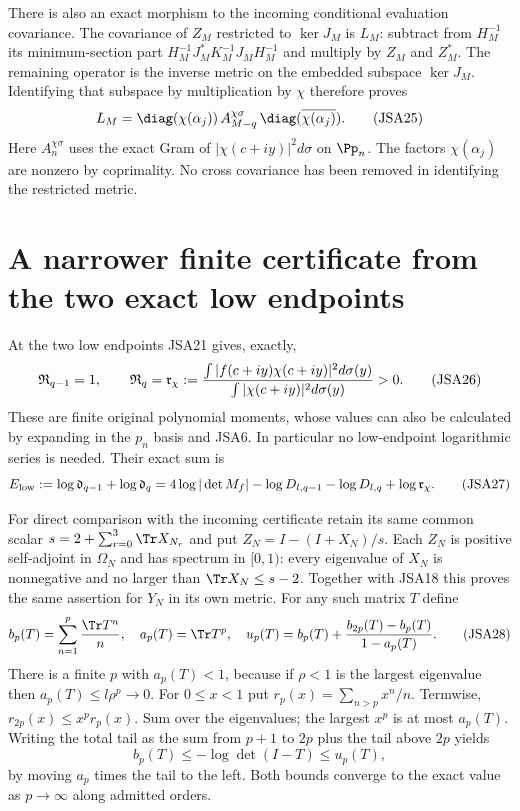 There is also an exact morphism to the incoming conditional
evaluation covariance. The covariance of $Z_M$ restricted to
$\ker J_M$ is $L_M$: subtract from $H_M^{-1}$ its minimum-section
part $H_M^{-1}J_M^*K_M^{-1}J_MH_M^{-1}$ and multiply by $Z_M$
and $Z_M^*$. The remaining operator is the inverse metric on
the embedded subspace $\ker J_M$. Identifying that subspace by
multiplication by $\chi$ therefore proves
\[
 L_M=\diag(\chi(\alpha_j))\,
       A_{M-q}^{\chi\sigma}\,
       \diag(\overline{\chi(\alpha_j)}).
\tag{JSA25}
\]
Here $A_n^{\chi\sigma}$ uses the exact Gram of
$|\chi(c+iy)|^2d\sigma$ on $\Pp_n$. The factors $\chi(\alpha_j)$
are nonzero by coprimality. No cross covariance has been removed
in identifying the restricted metric.

\section{A narrower finite certificate from the two exact low endpoints}

At the two low endpoints JSA21 gives, exactly,
\[
 \mathfrak R_{q-1}=1,\qquad
 \mathfrak R_q=\mathfrak r_\chi:={
    \int |f(c+iy)\chi(c+iy)|^2d\sigma(y)\over
    \int |\chi(c+iy)|^2d\sigma(y)}>0.
\tag{JSA26}
\]
These are finite original polynomial moments, whose values can
also be calculated by expanding in the $p_n$ basis and JSA6.
In particular no low-endpoint logarithmic series is needed.
Their exact sum is
\[
 E_{\rm low}:=\log\mathfrak d_{q-1}+\log\mathfrak d_q
  =4\log|\det M_f|-\log D_{l,q-1}-\log D_{l,q}
                        +\log\mathfrak r_\chi.
\tag{JSA27}
\]

For direct comparison with the incoming certificate retain its
same common scalar
$s=2+\sum_{r=0}^3\Tr X_{N_r}$ and put
$Z_N=I-(I+X_N)/s$. Each $Z_N$ is positive self-adjoint in
$\Omega_N$ and has spectrum in $[0,1)$: every eigenvalue of
$X_N$ is nonnegative and no larger than $\Tr X_N\leq s-2$.
Together with JSA18 this proves the same assertion for $Y_N$
in its own metric. For any such matrix $T$ define
\[
 b_p(T)=\sum_{n=1}^p{\Tr T^n\over n},\quad
 a_p(T)=\Tr T^p,\quad
 u_p(T)=b_p(T)+{b_{2p}(T)-b_p(T)\over1-a_p(T)}.
\tag{JSA28}
\]
There is a finite $p$ with $a_p(T)<1$, because if $\rho<1$ is
the largest eigenvalue then $a_p(T)\leq l\rho^p\to0$.
For $0\leq x<1$ put $r_p(x)=\sum_{n>p}x^n/n$. Termwise,
$r_{2p}(x)\leq x^p r_p(x)$. Sum over the eigenvalues; the
largest $x^p$ is at most $a_p(T)$. Writing the total tail as
the sum from $p+1$ to $2p$ plus the tail above $2p$ yields
\[
 b_p(T)\leq-\log\det(I-T)\leq u_p(T),
\tag{JSA29}
\]
by moving $a_p$ times the tail to the left. Both bounds converge
to the exact value as $p\to\infty$ along admitted orders.

